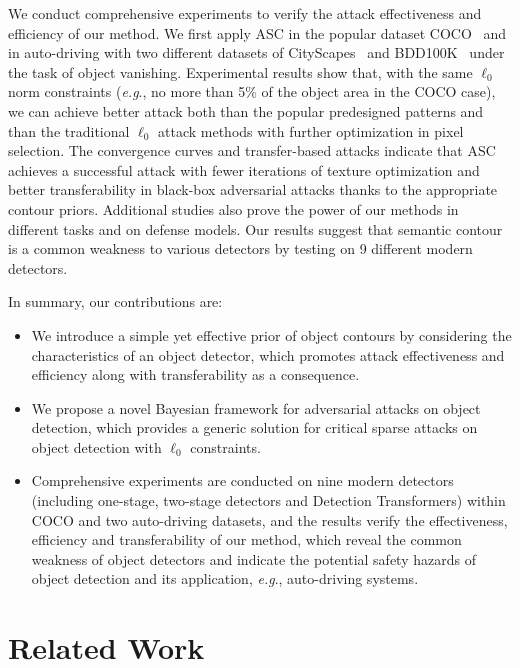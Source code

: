 \documentclass[times,twocolumn,final,authoryear]{elsarticle}
\def\onedot{.\null\xspace}
\def\eg{\emph{e.g}\onedot} \def\Eg{\emph{E.g}\onedot}
\begin{document}
We conduct comprehensive experiments to verify the attack effectiveness and efficiency of our method. We first apply ASC in the popular dataset COCO~\citep{lin2014microsoft} and in auto-driving with two different datasets of CityScapes~\citep{Cordts2016Cityscapes} and BDD100K~\citep{bdd100k} under the task of object vanishing. Experimental results show that, with the same $\ell_0$ norm constraints (\eg, no more than 5\% of the object area in the COCO case), we can achieve better attack both than the popular predesigned patterns and than the traditional $\ell_0$ attack methods with further optimization in pixel selection. The convergence curves and transfer-based attacks indicate that ASC achieves a successful attack with fewer iterations of texture optimization and better transferability in black-box adversarial attacks thanks to the appropriate contour priors. Additional studies also prove the power of our methods in different tasks and on defense models. Our results suggest that semantic contour is a common weakness to various detectors by testing on 9 different modern detectors.

In summary, our contributions are:
\begin{itemize}
    \item We introduce a simple yet effective prior of object contours by considering the characteristics of an object detector, which promotes attack effectiveness and efficiency along with transferability as a consequence.
    \item We propose a novel Bayesian framework for adversarial attacks on object detection, which provides a generic solution for critical sparse attacks on object detection with $\ell_0$ constraints.
    \item Comprehensive experiments are conducted on nine modern detectors (including one-stage, two-stage detectors and Detection Transformers) within COCO and two auto-driving datasets, and the results verify the effectiveness, efficiency and transferability of our method, which reveal the common weakness of object detectors and indicate the potential safety hazards of object detection and its application, \eg, auto-driving systems.
\end{itemize}


\section{Related Work}
\label{sec:related}
\end{document}
